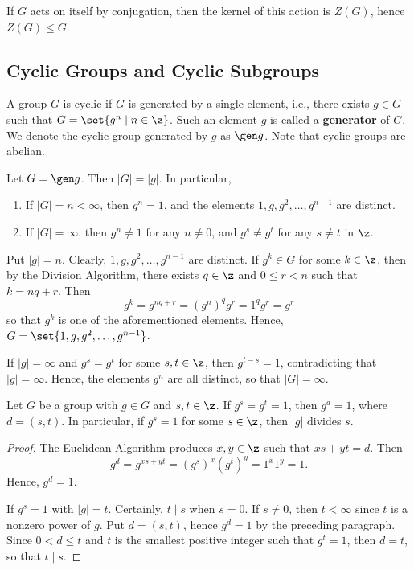 If $G$ acts on itself by conjugation, then the kernel of this action is $Z(G)$, hence $Z(G) \leq G$.
\newpage

\subsection{Cyclic Groups and Cyclic Subgroups} \label{sec2.3}

 A group $G$ is cyclic if $G$ is generated by a single element, i.e., there exists $g \in G$ such that $G = \set{g^n \mid n \in \z}$. Such an element $g$ is called a \textbf{generator} of $G$. We denote the cyclic group generated by $g$ as $\gen g$. Note that cyclic groups are abelian.

 \label{prop2.2}
Let $G = \gen g$. Then $|G| = |g|$. In particular,
\begin{enumerate}
    \item If $|G| = n < \infty$, then $g^n = 1$, and the elements $1, g, g^2, \ldots, g^{n - 1}$ are distinct.
    \item If $|G| = \infty$, then $g^n \neq 1$ for any $n \neq 0$, and $g^s \neq g^t$ for any $s \neq t$ in $\z$.
\end{enumerate}
\begin{proofnum}
    \item Put $|g| = n$. Clearly, $1, g, g^2, \ldots, g^{n - 1}$ are distinct. If $g^k \in G$ for some $k \in \z$, then by the Division Algorithm, there exists $q \in \z$ and $0 \leq r < n$ such that $k = nq + r$. Then
    \[g^k = g^{nq + r} = (g^n)^q g^r = 1^q g^r = g^r\]
    so that $g^k$ is one of the aforementioned elements. Hence, $G = \set{1, g, g^2, \ldots, g^{n - 1}}$.
    \item If $|g| = \infty$ and $g^s = g^t$ for some $s, t \in \z$, then $g^{t - s} = 1$, contradicting that $|g| = \infty$. Hence, the elements $g^n$ are all distinct, so that $|G| = \infty$.
\end{proofnum}

 \label{prop2.3}
Let $G$ be a group with $g \in G$ and $s, t \in \z$. If $g^s = g^t = 1$, then $g^d = 1$, where $d = (s, t)$. In particular, if $g^s = 1$ for some $s \in \z$, then $|g|$ divides $s$.
\begin{proof}
    The Euclidean Algorithm produces $x, y \in \z$ such that $xs + yt = d$. Then
    \[g^d = g^{xs + yt} = (g^s)^x (g^t)^y = 1^x 1^y = 1.\]
    Hence, $g^d = 1$.

    If $g^s = 1$ with $|g| = t$. Certainly, $t \mid s$ when $s = 0$. If $s \neq 0$, then $t < \infty$ since $t$ is a nonzero power of $g$. Put $d = (s, t)$, hence $g^d = 1$ by the preceding paragraph. Since $0 < d \leq t$ and $t$ is the smallest positive integer such that $g^t = 1$, then $d = t$, so that $t \mid s$.
\end{proof}

